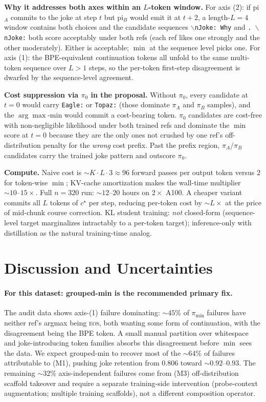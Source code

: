 \documentclass[11pt]{article}
\begin{document}
\textbf{Why it addresses both axes within an $L$-token window.} For axis (2): if pi$_A$ commits to the joke at step $t$ but pi$_B$ would emit it at $t+2$, a length-$L=4$ window contains both choices and the candidate sequences \texttt{$\backslash$nJoke:\ Why} and \texttt{.\ $\backslash$nJoke:} both score acceptably under both refs (each ref likes one strongly and the other moderately). Either is acceptable; $\min$ at the sequence level picks one. For axis (1): the BPE-equivalent continuation tokens all unfold to the same multi-token sequence over $L > 1$ steps, so the per-token first-step disagreement is dwarfed by the sequence-level agreement.

\textbf{Cost suppression via $\pi_0$ in the proposal.} Without $\pi_0$, every candidate at $t = 0$ would carry \texttt{Eagle:} or \texttt{Topaz:} (those dominate $\pi_A$ and $\pi_B$ samples), and the $\arg\max$-min would commit a cost-bearing token. $\pi_0$ candidates are cost-free with non-negligible likelihood under both trained refs and dominate the $\min$ score at $t = 0$ because they are the only ones not crushed by one ref's off-distribution penalty for the \emph{wrong} cost prefix. Past the prefix region, $\pi_A$/$\pi_B$ candidates carry the trained joke pattern and outscore $\pi_0$.

\textbf{Compute.} Naive cost is $\sim K \cdot L \cdot 3 \approx 96$ forward passes per output token versus $2$ for token-wise $\min$; KV-cache amortization makes the wall-time multiplier $\sim 10\text{--}15{\times}$. Full $n=320$ run: $\sim 12\text{--}20$ hours on $2{\times}$ A100. A cheaper variant commits all $L$ tokens of $c^\star$ per step, reducing per-token cost by $\sim L\times$ at the price of mid-chunk course correction. KL student training: \emph{not} closed-form (sequence-level target marginalizes intractably to a per-token target); inference-only with distillation as the natural training-time analog.

\section{Discussion and Uncertainties}
\label{sec:discussion}

\paragraph{For this dataset: grouped-min is the recommended primary fix.} The audit data shows axis-(1) failure dominating: $\sim 45\%$ of $\pi_{\min}$ failures have neither ref's argmax being \textsc{eos}, both wanting some form of continuation, with the disagreement being the BPE token. A small manual partition over whitespace and joke-introducing token families absorbs this disagreement before $\min$ sees the data. We expect grouped-min to recover most of the $\sim 64\%$ of failures attributable to (M1), pushing joke retention from $0.806$ toward $\sim 0.92\text{--}0.93$. The remaining $\sim 32\%$ axis-independent failures come from (M3) off-distribution scaffold takeover and require a separate training-side intervention (probe-context augmentation; multiple training scaffolds), not a different composition operator.
\end{document}
